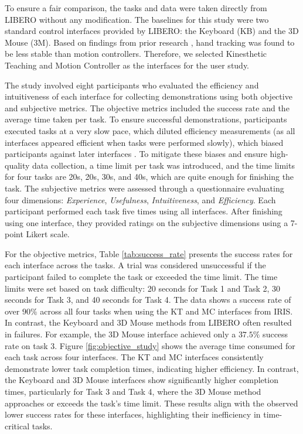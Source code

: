 

To ensure a fair comparison, the tasks and data were taken directly from LIBERO \cite{liu2024libero} without any modification.
The baselines for this study were two standard control interfaces provided by LIBERO: the Keyboard (KB) and the 3D Mouse (3M).
Based on findings from prior research \cite{jiang2024comprehensive},
hand tracking was found to be less stable than motion controllers. Therefore, we selected Kinesthetic Teaching and Motion Controller as the interfaces for the user study.

The study involved eight participants who evaluated the efficiency and intuitiveness of each interface for collecting demonstrations using both objective and subjective metrics.
The objective metrics included the success rate and the average time taken per task.
To ensure successful demonstrations, 
participants executed tasks at a very slow pace, which diluted efficiency measurements (as all interfaces appeared efficient when tasks were performed slowly), which biased participants against later interfaces \cite{jiang2024comprehensive}. 
To mitigate these biases and ensure high-quality data collection, a time limit per task was introduced,
and the time limits for four tasks are 20s, 20s, 30s, and 40s, which are quite enough for finishing the task.
The subjective metrics were assessed through a questionnaire evaluating four dimensions: \textit{Experience}, \textit{Usefulness}, \textit{Intuitiveness}, and \textit{Efficiency}.
Each participant performed each task five times using all interfaces. After finishing using one interface, they provided ratings on the subjective dimensions using a 7-point Likert scale.



For the objective metrics, Table \ref{tab:success_rate} presents the success rates for each interface across the tasks. 
A trial was considered unsuccessful if the participant failed to complete the task or exceeded the time limit. The time limits were set based on task difficulty: 20 seconds for Task 1 and Task 2, 30 seconds for Task 3, and 40 seconds for Task 4.
The data shows a success rate of over $90\%$ across all four tasks when using the KT and MC interfaces from IRIS. In contrast, the Keyboard and 3D Mouse methods from LIBERO often resulted in failures. For example, the 3D Mouse interface achieved only a $37.5\%$ success rate on task 3.
Figure \ref{fig:objective_study} shows the average time consumed for each task across four interfaces. The KT and MC interfaces consistently demonstrate lower task completion times, indicating higher efficiency. In contrast, the Keyboard and 3D Mouse interfaces show significantly higher completion times, particularly for Task 3 and Task 4, where the 3D Mouse method approaches or exceeds the task's time limit. These results align with the observed lower success rates for these interfaces, highlighting their inefficiency in time-critical tasks.


